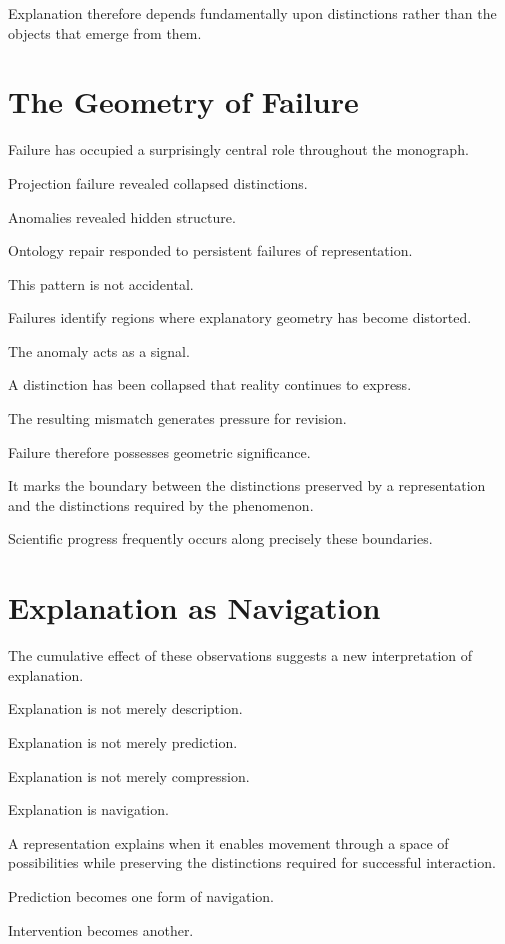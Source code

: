 \documentclass[11pt,oneside,openany]{book}
\begin{document}
Explanation therefore depends fundamentally upon distinctions rather than the objects that emerge from them.

\section{The Geometry of Failure}

Failure has occupied a surprisingly central role throughout the monograph.

Projection failure revealed collapsed distinctions.

Anomalies revealed hidden structure.

Ontology repair responded to persistent failures of representation.

This pattern is not accidental.

Failures identify regions where explanatory geometry has become distorted.

The anomaly acts as a signal.

A distinction has been collapsed that reality continues to express.

The resulting mismatch generates pressure for revision.

Failure therefore possesses geometric significance.

It marks the boundary between the distinctions preserved by a representation and the distinctions required by the phenomenon.

Scientific progress frequently occurs along precisely these boundaries.

\section{Explanation as Navigation}

The cumulative effect of these observations suggests a new interpretation of explanation.

Explanation is not merely description.

Explanation is not merely prediction.

Explanation is not merely compression.

Explanation is navigation.

A representation explains when it enables movement through a space of possibilities while preserving the distinctions required for successful interaction.

Prediction becomes one form of navigation.

Intervention becomes another.
\end{document}
